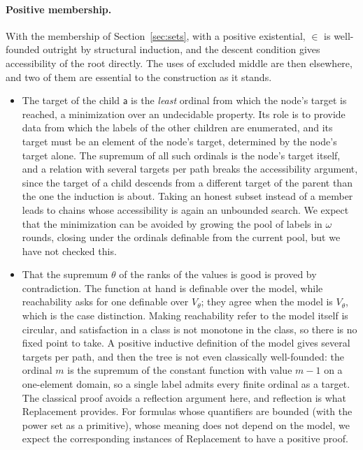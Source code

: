 \documentclass[10pt]{article}
\theoremstyle{definition}
\theoremstyle{remark}
\newcommand{\la}{\mathsf{a}}
\begin{document}
\paragraph{Positive membership.}
With the membership of Section~\ref{sec:sets}, with a positive existential, $\in$ is well-founded outright by structural induction, and the
descent condition gives accessibility of the root directly. The uses of
excluded middle are then elsewhere, and two of them are essential to the
construction as it stands.
\begin{itemize}
\item The target of the child $\la$ is the \emph{least} ordinal from
  which the node's target is reached, a minimization over an undecidable
  property. Its role is to provide data from which the labels of the
  other children are enumerated, and its target must be an element of
  the node's target, determined by the node's target alone. The
  supremum of all such ordinals is the node's target itself, and a
  relation with several targets per path breaks the accessibility
  argument, since the target of a child descends from a different
  target of the parent than the one the induction is about. Taking an
  honest subset instead of a member leads to chains whose accessibility
  is again an unbounded search. We expect that the minimization can be
  avoided by growing the pool of labels in $\omega$ rounds, closing under
  the ordinals definable from the current pool, but we have not checked
  this.
\item That the supremum $\theta$ of the ranks of the values is good is
  proved by contradiction. The function at hand is definable over the
  model, while reachability asks for one definable over $V_\theta$; they
  agree when the model is $V_\theta$, which is the case distinction. Making
  reachability refer to the model itself is circular, and satisfaction
  in a class is not monotone in the class, so there is no fixed point to
  take. A positive inductive definition of the model gives several
  targets per path, and then the tree is not even classically
  well-founded: the ordinal $m$ is the supremum of the constant function
  with value $m-1$ on a one-element domain, so a single label admits every
  finite ordinal as a target. The classical proof avoids a reflection
  argument here, and reflection is what Replacement provides. For formulas
  whose quantifiers are bounded (with the power set as a primitive),
  whose meaning does not depend on the model, we expect the
  corresponding instances of Replacement to have a positive proof.
\end{itemize}
\end{document}
